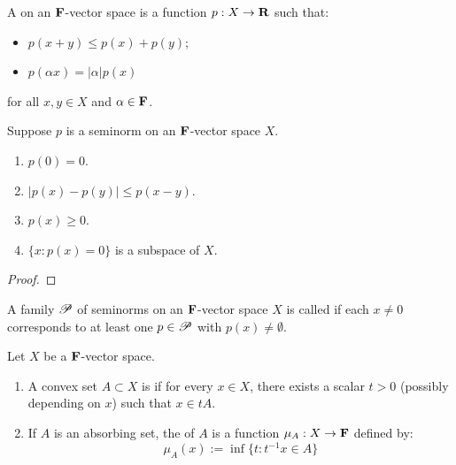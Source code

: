 \begin{definition}
	A  on an $\mathbf{F}$-vector space is a function $p:X \rightarrow \mathbf{R}$ such that:
	\mbox{}
	\begin{itemize}[itemsep=1pt,topsep=3pt]
		\item $p(x+y) \leq p(x) + p(y)$;
		\item $p(\alpha x ) = |\alpha| p(x)$
	\end{itemize}
	for all $x,y \in X$ and $\alpha \in \mathbf{F}$.
\end{definition}

\begin{proposition}
	Suppose $p$ is a seminorm on an $\mathbf{F}$-vector space $X$.
	\mbox{}
	\begin{enumerate}[label = (\alph*),itemsep=1pt,topsep=3pt]
		\item $p(0)=0$.
		\item $|p(x)-p(y)| \leq p(x-y)$.
		\item $p(x) \geq 0$.
		\item $\{x:p(x) = 0\}$ is a  subspace of $X$.
	\end{enumerate}
\end{proposition}
	{\color{red}
	\begin{proof}
		
	\end{proof}}

\begin{definition}
	A family $\mathscr{P}$ of seminorms on an $\mathbf{F}$-vector space $X$ is called  if each $x\neq 0$ corresponds to at least one $p \in \mathscr{P}$ with $p(x)\neq \emptyset $.
\end{definition}

\begin{definition}
	Let $X$ be a $\mathbf{F}$-vector space.
	\mbox{}
	\begin{enumerate}[label = (\alph*),itemsep=1pt,topsep=3pt]
		\item A convex set $A \subset X$ is  if for every $x \in X$, there exists a scalar $t > 0$ (possibly depending on $x$) such that $x \in tA$.
		\item If $A$ is an absorbing set, the  of $A$ is a function $\mu_A:X \rightarrow \mathbf{F}$ defined by:			\[
			\mu_A(x) := \inf \{t : t^{-1}x \in A\}
		\] 
	\end{enumerate}
\end{definition}

